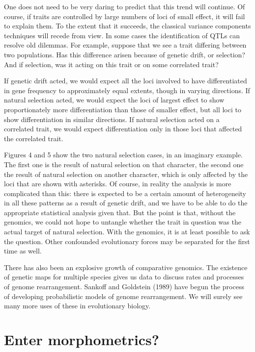 \documentclass[12pt]{article}
\begin{document}
One does not need to be very daring to predict that this trend will continue.  Of course,
if traits are controlled by large numbers of loci of small
effect, it will fail to explain them.  To the extent that it succeeds,
the classical variance components techniques will recede from view.   In some
cases the identification of QTLs can resolve old dilemmas.  For example,
suppose that we see a trait differing between two populations.  Has this
difference arisen because of genetic drift, or selection?  And if selection,
was it acting on this trait or on some correlated trait?

If genetic drift acted, we would expect all the loci involved to have
differentiated in gene frequency to approximately equal extents, though in
varying directions.   If
natural selection acted, we would expect the loci of largest effect to show
proportionately more differentiation than those of smaller effect, but
all loci to show differentiation in similar directions.  If natural selection
acted on a correlated trait, we would expect differentiation only in those
loci that affected the correlated trait.

Figures 4 and 5 show the two natural selection cases, in an imaginary
example.  The first one is the result of natural selection on that character,
the second one the result of natural selection on another character, which is
only affected by the loci that are shown with asterisks.  Of course, in
reality the analysis is more complicated than this: there is expected to be
a certain amount of heterogeneity in all these patterns as a result of
genetic drift, and we have to be able to do the appropriate statistical
analysis given that.  But the point is that, without the genomics, we
could not hope to untangle whether the trait in question was the actual
target of natural selection.  With the genomics, it is at least possible to
ask the question.  Other confounded evolutionary forces may be separated for
the first time as well.

There has also been an explosive growth of comparative genomics.  The
existence of genetic maps for multiple species gives us data to discuss
rates and processes of genome rearrangement.  Sankoff and Goldstein (1989) have begun
the process of developing probabilistic models of genome rearrangement.  We
will surely see many more uses of these in evolutionary biology.

\section*{Enter morphometrics?}
\end{document}
